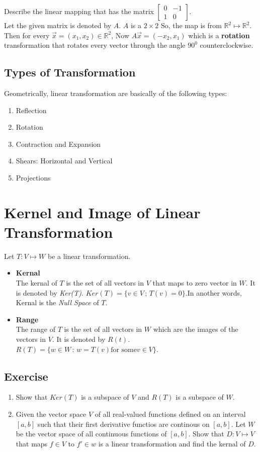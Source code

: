 \documentclass[aima104_lecturenotes_ku.tex]{subfiles}
\begin{document}
\begin{example}
  Describe the linear mapping that has the matrix $\begin{bmatrix}
    0 & -1 \\ 1 & 0
  \end{bmatrix}$. \\[1mm]
  Let the given matrix is denoted by $A$. $A$ is a $2 \times 2$ So, the map is from $\mathbb{R}^2 \mapsto \mathbb{R}^2$. Then for every $\vec{x}=(x_1,x_2) \in \mathbb{R}^2$, Now $A\vec{x}= (-x_2,x_1)$ which is a \textbf{rotation} transformation that rotates every vector through the angle $90^0$ counterclockwise.
\end{example}

\subsection{Types of Transformation}
Geometrically, linear transformation are basically of the following types:
\begin{enumerate}
\item Reflection
\item Rotation
\item Contraction and Expansion
\item Shears: Horizontal and Vertical
\item Projections
\end{enumerate}

\section{Kernel and Image of Linear Transformation}
Let $T:V \mapsto W$ be a linear transformation.
\begin{itemize}
\item \textbf{Kernal}\\[1mm]
  The kernal of $T$ is the set of all vectors in $V$ that maps to zero vector in $W$. It is denoted by \textit{Ker(T)}. $Ker(T)=\{v \in V\, ; \, T(v)=0\}$.In another words, Kernal is the \textit{Null Space} of $T$.
\item \textbf{Range} \\[1mm]
  The range of $T$ is the set of all vectors in $W$ which are the images of the vectors in $V$. It is denoted by $R(t)$. $R(T)=\{w \in W \, : \, w = T(v) \text{for some}  v \in V\}$.
\end{itemize}

\subsection{Exercise}
\begin{enumerate}
\item Show that $Ker(T)$ is a subspace of $V$ and $R(T)$ is a subspace of $W$.
\item  Given the vector space $V$ of all real-valued functions defined on an interval $[a,b]$ such that their first derivative functios are continous on $[a,b]$. Let $W$ be the vector space of all continuous functions of $[a,b]$. Show that $D: V \mapsto V$ that maps $f \in V$ to $f' \in w$ is a linear transformation and find the kernal of $D$.
\end{enumerate}
\end{document}
